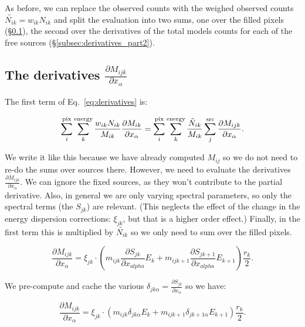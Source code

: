 \documentclass[preprint]{aastex}
\begin{document}
\noindent As before, we can replace the observed counts with the
weighed observed counts $\tilde{N_{ik}} = w_{ik} N_{ik}$ and split the
evaluation into two sums, one over the filled pixels
(\S\ref{subsec:derivatives_part1}), the second over the derivatives of
the total models counts for each of the free sources
(\S\ref{subsec:derivatives_part2}).


\subsection{The derivatives $\frac{\partial M_{ijk}}{\partial x_{\alpha}}$}\label{subsec:derivatives_part1}

The first term of Eq.~\ref{eq:derivatives} is:

\begin{equation}
  \sum_i^{\rm pix} \sum_k^{\rm energy} \frac{w_{ik} N_{ik}}{M_{ik}} \frac{\partial M_{ik}}{\partial x_{\alpha}} = 
  \sum_i^{\rm pix} \sum_k^{\rm energy} \frac{\tilde{N}_{ik}}{M_{ik}} \sum_j^{\rm src} \frac{\partial M_{ijk}}{\partial x_{\alpha}}.
\end{equation}

We write it like this because we have already computed $M_{ij}$ so we
do not need to re-do the sums over sources there.  However, we need to
evaluate the derivatives $\frac{\partial M_{ijk}}{\partial x_{\alpha}}$.
We can ignore the fixed sources, as they won't contribute to the
partial derivative.  Also, in general we are only varying spectral
parameters, so only the spectral terms (the $S_{jk}$) are relevant.
(This neglects the effect of the change in the energy dispersion
corrections: $\xi_{jk}$, but that is a higher order effect.)  Finally,
in the first term this is multiplied by $\tilde{N_{ik}}$ so we only
need to sum over the filled pixels.

\begin{equation}
  \frac{\partial M_{ijk}}{\partial x_{\alpha}} = \xi_{jk} \cdot (m_{ijk} \frac{\partial S_{jk}}{\partial x_{alpha}} E_k +  m_{ijk+1} \frac{\partial S_{jk+1}}{\partial x_{alpha}} E_{k+1}) \frac{r_k}{2}.
\end{equation}

\noindent We pre-compute and cache the various $\delta_{jk\alpha} = \frac{\partial S_{jk}}{\partial x_{\alpha}}$ so we have:

\begin{equation}
  \frac{\partial M_{ijk}}{\partial x_{\alpha}} = \xi_{jk} \cdot (m_{ijk} \delta_{jk\alpha} E_k +  m_{ijk+1} \delta_{jk+1\alpha} E_{k+1}) \frac{r_k}{2}.
\end{equation}
\end{document}
